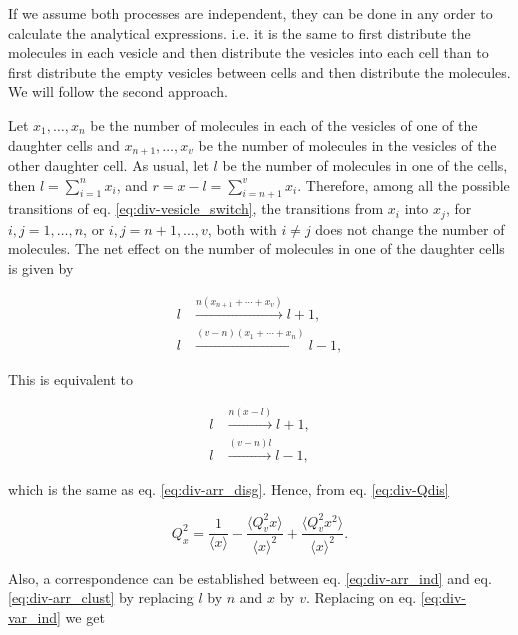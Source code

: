If we assume both processes are independent, they can be done in any order to calculate the analytical expressions. i.e. it is the same to first distribute the molecules in each vesicle and then distribute the vesicles into each cell than to first distribute the empty vesicles between cells and then distribute the molecules. We will follow the second approach.

Let $x_1,\dotsc,x_n$ be the number of molecules in each of the vesicles of one of the daughter cells and $x_{n+1},\dotsc,x_v$ be the number of molecules in the vesicles of the other daughter cell. As usual, let $l$ be the number of molecules in one of the cells, then $l = \sum_{i=1}^nx_i$, and $r = x-l = \sum_{i=n+1}^vx_i$. Therefore, among all the possible transitions of eq. \eqref{eq:div-vesicle_switch}, the transitions from $x_i$ into $x_j$, for $i,j=1,\dotsc,n$, or $i,j=n+1,\dotsc,v$, both with $i\neq j$ does not change the number of molecules. The net effect on the number of molecules in one of the daughter cells is given by

\begin{equation*}
  \begin{split}
    l&\xrightarrow{n(x_{n+1}+\dotsb+x_{v})}l+1,\\
    l&\xrightarrow{(v-n)(x_1+\dotsb+x_n)}l-1,
  \end{split}
\end{equation*}

This is equivalent to

\begin{equation*}
  \begin{split}
    l&\xrightarrow{n(x-l)}l+1,\\
    l&\xrightarrow{(v-n)l}l-1,
  \end{split}
\end{equation*}

which is the same as eq. \eqref{eq:div-arr_disg}. Hence, from eq. \eqref{eq:div-Qdis}

\begin{equation}
  \label{eq:div-clus-Qx1}
  Q_x^2 = \frac{1}{\langle x\rangle} - \frac{\langle Q_v^2x\rangle}{\langle x\rangle^2} + \frac{\langle Q_v^2x^2\rangle}{\langle x\rangle^2}.
\end{equation}

Also, a correspondence can be established between eq. \eqref{eq:div-arr_ind} and eq. \eqref{eq:div-arr_clust} by replacing $l$ by $n$ and $x$ by $v$. Replacing on eq. \eqref{eq:div-var_ind} we get

